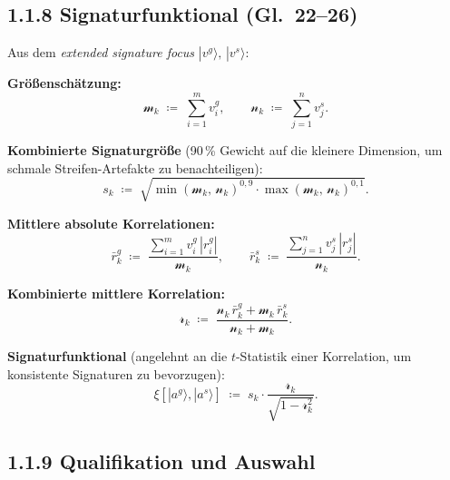 \subsection*{1.1.8 Signaturfunktional (Gl.~22--26)}
 
Aus dem \emph{extended signature focus} $|v^g\rangle,\,|v^s\rangle$:
 
\textbf{Gr\"{o}{\ss}ensch\"{a}tzung:}
\begin{equation}
    \mathcal{m}_k \;\coloneqq\; \sum_{i=1}^m v^g_i,
    \qquad
    \mathcal{n}_k \;\coloneqq\; \sum_{j=1}^n v^s_j.
\end{equation}
 
\textbf{Kombinierte Signaturgr\"{o}{\ss}e} (90\,\% Gewicht auf die kleinere
Dimension, um schmale Streifen-Artefakte zu benachteiligen):
\begin{equation}
    s_k \;\coloneqq\;
    \sqrt{\min(\mathcal{m}_k,\,\mathcal{n}_k)^{0{,}9}
          \cdot \max(\mathcal{m}_k,\,\mathcal{n}_k)^{0{,}1}}.
\end{equation}
 
\textbf{Mittlere absolute Korrelationen:}
\begin{equation}
    \bar{r}^g_k
    \;\coloneqq\;
    \frac{\displaystyle\sum_{i=1}^m v^g_i\,|r^g_i|}{\mathcal{m}_k},
    \qquad
    \bar{r}^s_k
    \;\coloneqq\;
    \frac{\displaystyle\sum_{j=1}^n v^s_j\,|r^s_j|}{\mathcal{n}_k}.
\end{equation}
 
\textbf{Kombinierte mittlere Korrelation:}
\begin{equation}
    \mathcal{r}_k
    \;\coloneqq\;
    \frac{\mathcal{n}_k\,\bar{r}^g_k + \mathcal{m}_k\,\bar{r}^s_k}
         {\mathcal{n}_k + \mathcal{m}_k}.
\end{equation}
 
\textbf{Signaturfunktional} (angelehnt an die $t$-Statistik einer
Korrelation, um konsistente Signaturen zu bevorzugen):
\begin{equation}
    \xi[|a^g\rangle, |a^s\rangle]
    \;\coloneqq\;
    s_k \cdot \frac{\mathcal{r}_k}{\sqrt{1 - \mathcal{r}_k^2}}.
\end{equation}
 
\subsection*{1.1.9 Qualifikation und Auswahl}
 
